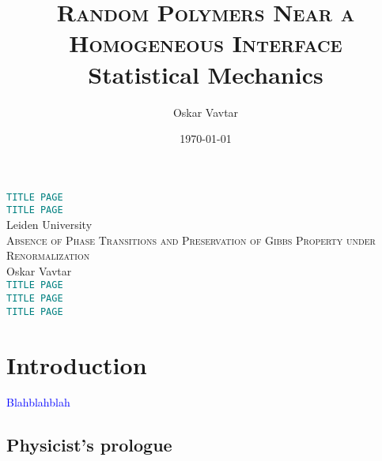\documentclass[12pt]{article}
\title{\textsc{Random Polymers Near a Homogeneous Interface}\\\vspace{0.3cm}\small{Statistical Mechanics}\vspace{-0.7cm}}
\author{Oskar Vavtar}
\date{\today}
\newcommand{\1}{\mathbbm{1}}
\newcommand{\5}{\vspace{0.5cm}}
\theoremstyle{definition}
\begin{document}
\begin{center}
\Huge{\textcolor{teal}{\texttt{TITLE PAGE}}} \\
\vspace{2cm}
\Huge{\textcolor{teal}{\texttt{TITLE PAGE}}} \\
\vspace{2cm}
Leiden University \\
\vspace{2cm}
{\textsc{Absence of Phase Transitions and Preservation of Gibbs Property under Renormalization}} \\
\vspace{2cm}
Oskar Vavtar \\
\vspace{2cm}
\Huge{\textcolor{teal}{\texttt{TITLE PAGE}}} \\
\vspace{2cm}
\Huge{\textcolor{teal}{\texttt{TITLE PAGE}}} \\
\vspace{2cm}
\Huge{\textcolor{teal}{\texttt{TITLE PAGE}}}
\end{center}
\pagebreak
\tableofcontents
\pagebreak


\section{Introduction}\label{ch:1}

\textcolor{blue}{Blahblahblah}


\subsection{Physicist's prologue}
\end{document}
